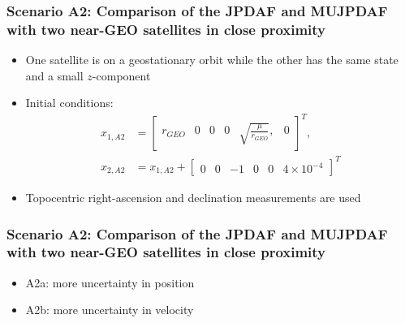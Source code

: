 \documentclass[hyperref={pdftex,pdfpagemode=none,pdfstartview=FitH},10pt]{beamer}
\begin{document}
\begin{frame}
\frametitle{Scenario A2: Comparison of the JPDAF and MUJPDAF with two near-GEO satellites in close proximity}


\begin{itemize}
\item One satellite is on a geostationary orbit while the other has the same state and a small $z$-component
\item Initial conditions:
\begin{align}
x_{1,A2}&=\begin{bmatrix}r_{GEO} & 0 & 0 & 0 & \sqrt{\frac{\mu}{r_{GEO}}}, & 0\end{bmatrix}^T,\nonumber
\\
x_{2,A2}&=x_{1,A2}+\begin{bmatrix}
0 & 0 & -1 & 0 & 0 & 4\times10^{-4}
\end{bmatrix}^T\nonumber
\end{align}
\item Topocentric right-ascension and declination measurements are used
\end{itemize}


\end{frame}

\begin{frame}
\frametitle{Scenario A2: Comparison of the JPDAF and MUJPDAF with two near-GEO satellites in close proximity}


\begin{itemize}
\item A2a: more uncertainty in position
\item A2b: more uncertainty in velocity
\end{itemize}

\begin{figure}
\centerline{
}
\centerline{
}
\caption{}
\end{figure}

\end{frame}
\end{document}
